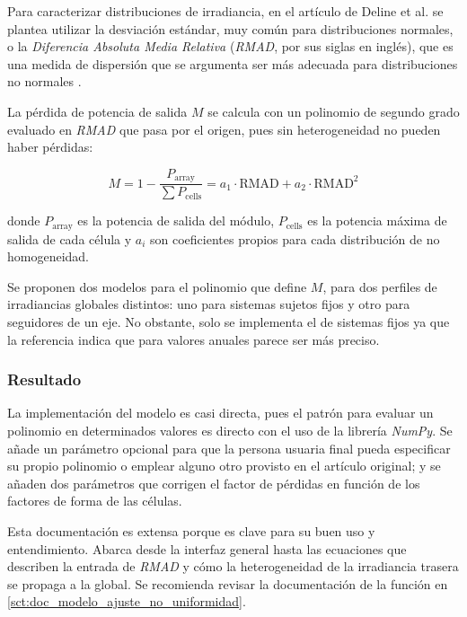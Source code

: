 Para caracterizar distribuciones de irradiancia, en el artículo de Deline et al. \cite{Deline_Ayala_Pelaez_MacAlpine_Olalla_2020} se plantea utilizar la desviación estándar, muy común para distribuciones normales, o la \textit{Diferencia Absoluta Media Relativa} (\textit{RMAD}, por sus siglas en inglés), que es una medida de dispersión que se argumenta ser más adecuada para distribuciones no normales \cite{Ginis_mean_difference_2003}.

La pérdida de potencia de salida $M$ se calcula con un polinomio de segundo grado evaluado en \textit{RMAD} que pasa por el origen, pues sin heterogeneidad no pueden haber pérdidas:

\begin{equation} \label{eq:perdidas_heterogeneidad}
    M = 1 - \frac{P_\text{array}}{\sum P_\text{cells}} = a_1 \cdot \text{RMAD} + a_2 \cdot \text{RMAD}^2
\end{equation}

donde $P_\text{array}$ es la potencia de salida del módulo, $P_\text{cells}$ es la potencia máxima de salida de cada célula y $a_i$ son coeficientes propios para cada distribución de no homogeneidad.

Se proponen dos modelos para el polinomio que define $M$, para dos perfiles de irradiancias globales distintos: uno para \gls{sistemas sujetos fijos} y otro para \gls{seguidores de un eje}. No obstante, solo se implementa el de sistemas fijos ya que la referencia indica que para valores anuales parece ser más preciso.

\subsubsection{Resultado}

La implementación del modelo es casi directa, pues el patrón para evaluar un polinomio en determinados valores es directo con el uso de la librería \textit{NumPy}. Se añade un \gls{parámetro} opcional para que la persona usuaria final pueda especificar su propio polinomio o emplear alguno otro provisto en el artículo original; y se añaden dos parámetros que corrigen el factor de pérdidas en función de los factores de forma de las células.

Esta documentación es extensa porque es clave para su buen uso y entendimiento. Abarca desde la interfaz general hasta las ecuaciones que describen la entrada de \textit{RMAD} y cómo la heterogeneidad de la irradiancia trasera se propaga a la global. Se recomienda revisar la documentación de la función en \ref{sct:doc_modelo_ajuste_no_uniformidad}.

